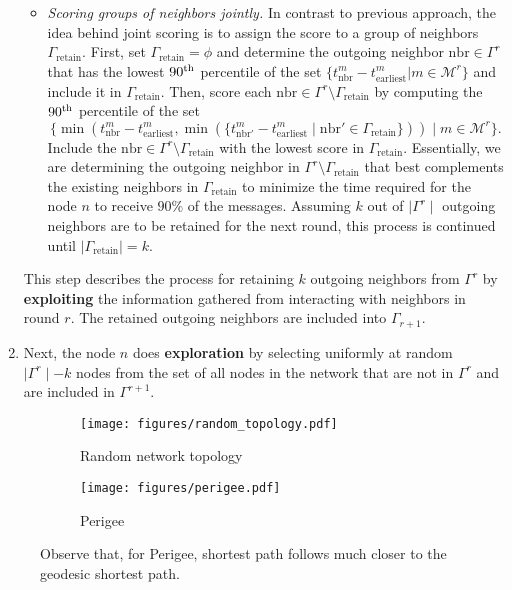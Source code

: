 \documentclass{article}
\begin{document}
\begin{enumerate}
\begin{itemize}
        \item \textit{Scoring groups of neighbors jointly.} In contrast to previous approach, the idea behind joint scoring is to assign the score to a group of neighbors $\Gamma_{\text{retain}}$. First, set $\Gamma_{\text{retain}} = \phi$ and determine the outgoing neighbor $\text{nbr} \in \Gamma^r$ that has the lowest $90\textsuperscript{th}$ percentile of the set $\{t^m_{\text{nbr}} - t^m_{\text{earliest}} \vert m \in \mathcal{M}^r\}$ and include it in $\Gamma_{\text{retain}}$. Then, score each $\text{nbr} \in \Gamma^r \setminus \Gamma_{\text{retain}}$ by computing the $90\textsuperscript{th}$ percentile of the set \[\{ \min(t^{m}_{\text{nbr}} - t^{m}_{\text{earliest}}, \min(\{t^{m}_{\text{nbr}'} - t^{m}_{\text{earliest}} \mid \text{nbr}' \in \Gamma_{\text{retain}}\})) \mid m \in \mathcal{M}^r\}.\] Include the $\text{nbr} \in \Gamma^r \setminus \Gamma_{\text{retain}}$ with the lowest score in $\Gamma_{\text{retain}}$. Essentially, we are determining the outgoing neighbor in  $\Gamma^r \setminus \Gamma_{\text{retain}}$ that best complements the existing neighbors in $\Gamma_{\text{retain}}$ to minimize the time required for the node $n$ to receive $90\%$ of the messages. Assuming  $k$ out of $\mid \Gamma^r \mid$ outgoing neighbors are to be retained for the next round, this process is continued until $\mid \Gamma_{\text{retain}} \mid = k$.
    \end{itemize}
    This step describes the process for retaining $k$ outgoing neighbors from $\Gamma^r$ by \textbf{exploiting} the information gathered from interacting with neighbors in round $r$. The retained outgoing neighbors are included into $\Gamma_{r+1}$.
    \item  Next, the node $n$ does \textbf{exploration} by selecting uniformly at random $\mid \Gamma^r \mid - k$ nodes from the set of all nodes in the network that are not in $\Gamma^r$ and are included in $\Gamma^{r+1}$. 
\end{enumerate}
\begin{figure}[ht]
\centering
\begin{subfigure}{.5\textwidth}
  \centering
  \texttt{[image: figures/random\_topology.pdf]}
  \caption{Random network topology}
  \label{fig:random-topology}
\end{subfigure}%
\begin{subfigure}{.5\textwidth}
  \centering
  \texttt{[image: figures/perigee.pdf]}
  \caption{Perigee}
  \label{fig:perigee}
\end{subfigure}
\caption{Observe that, for Perigee, shortest path follows much closer to the geodesic shortest path.}
\end{figure}
\end{document}
